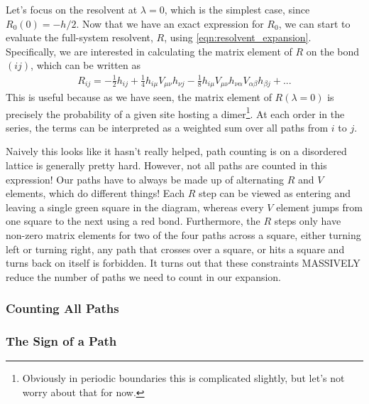 \documentclass[11pt, oneside]{article} %
\numberwithin{equation}{section}
\begin{document}
Let's focus on the resolvent at $\lambda = 0$, which is the simplest case, since $R_0(0) = -h/2$.
Now that we have an exact expression for $R_0$, we can start to evaluate the full-system resolvent, $R$, using \cref{eqn:resolvent_expansion}. Specifically, we are interested in calculating the matrix element of $R$ on the bond $(ij)$, which can be written as
\begin{align}
    R_{ij} = -\frac 12 h_{ij} + \frac 14 h_{ i\mu} V_{\mu \nu}h_{ \nu j} -\frac 18 h_{ i\mu} V_{\mu \nu} h_{ \nu\alpha} V_{\alpha \beta}h_{ \beta j} + ...
\end{align}
This is useful because as we have seen, the matrix element of $R(\lambda = 0)$ is precisely the probability of a given site hosting a dimer\footnote{Obviously in periodic boundaries this is complicated slightly, but let's not worry about that for now.}. At each order in the series, the terms can be interpreted as a weighted sum over all paths from $i$ to $j$. 

Naively this looks like it hasn't really helped, path counting is on a disordered lattice is generally pretty hard. However, not all paths are counted in this expression! Our paths have to always be made up of alternating $R$ and $V$ elements, which do different things! Each $R$ step can be viewed as entering and leaving a single green square in the diagram, whereas every $V$ element jumps from one square to the next using a red bond. Furthermore, the $R$ steps only have non-zero matrix elements for two of the four paths across a square, either turning left or turning right, any path that crosses over a square, or hits a square and turns back on itself is forbidden. It turns out that these constraints MASSIVELY reduce the number of paths we need to count in our expansion.

\subsubsection{Counting All Paths}
\subsubsection{The Sign of a Path}
\end{document}
